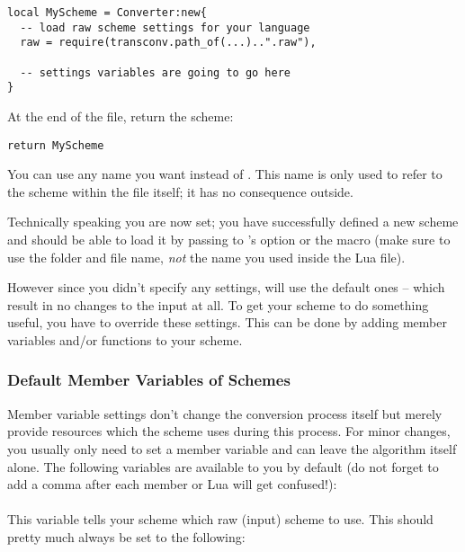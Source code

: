 \documentclass{ltxdockit}
\begin{document}
\begin{lstlisting}
local MyScheme = Converter:new{
  -- load raw scheme settings for your language
  raw = require(transconv.path_of(...)..".raw"),

  -- settings variables are going to go here
}
\end{lstlisting}

At the end of the file, return the scheme:

\begin{lstlisting}
return MyScheme
\end{lstlisting}

You can use any name you want instead of . This name is only used
to refer to the scheme within the file itself; it has no consequence outside.

Technically speaking you are now set; you have successfully defined a new scheme
and should be able to load it by passing  to
's  option or the
 macro (make sure to use the
folder and file name, \emph{not} the name you used inside the Lua file).

However since you didn't specify any settings,  will use the
default ones -- which result in no changes to the input at all. To get your
scheme to do something useful, you have to override these settings. This can be
done by adding member variables and/or functions to your scheme.

\subsubsection{Default Member Variables of Schemes}

Member variable settings don't change the conversion process itself but merely
provide resources which the scheme uses during this process. For minor changes,
you usually only need to set a member variable and can leave the algorithm
itself alone. The following variables are available to you by default (do not
forget to add a comma after each member or Lua will get confused!):

\paragraph{}

This variable tells your scheme which raw (input) scheme to use. This should
pretty much always be set to the following:
\end{document}
